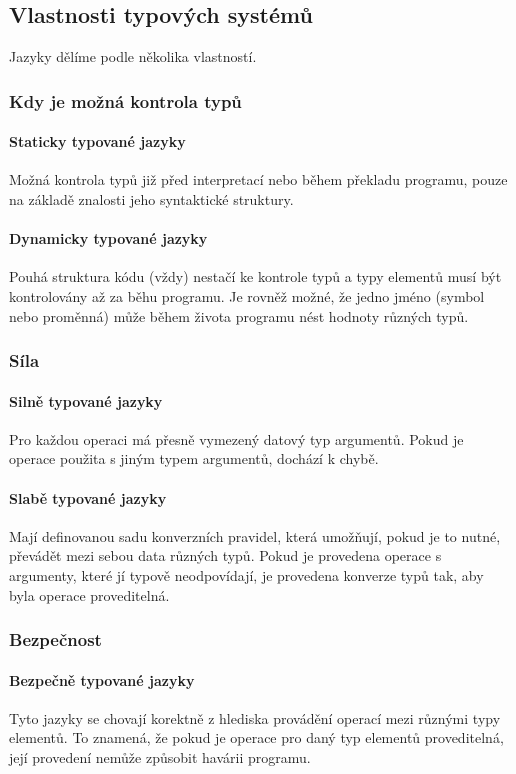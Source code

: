 \documentclass[10pt,a4paper]{article}
\begin{document}
  \subsection{Vlastnosti typových systémů}
    Jazyky dělíme podle několika vlastností.
    \subsubsection*{Kdy je možná kontrola typů}
      \paragraph{Staticky typované jazyky}
        Možná kontrola typů již před interpretací nebo během překladu programu, pouze na základě znalosti jeho syntaktické struktury.
      \paragraph{Dynamicky typované jazyky}
        Pouhá struktura kódu (vždy) nestačí ke kontrole typů a typy elementů musí být kontrolovány až za běhu programu. Je rovněž možné, že jedno jméno (symbol nebo proměnná) může během života programu nést hodnoty různých typů.
    \subsubsection*{Síla}
      \paragraph{Silně typované jazyky}
        Pro každou operaci má přesně vymezený datový typ argumentů. Pokud je operace použita s jiným typem argumentů, dochází k chybě.
      \paragraph{Slabě typované jazyky}
        Mají definovanou sadu konverzních pravidel, která umožňují, pokud je to nutné, převádět mezi sebou data různých typů. Pokud je provedena operace s argumenty, které jí typově neodpovídají, je provedena konverze typů tak, aby byla operace proveditelná.
    \subsubsection*{Bezpečnost}
      \paragraph{Bezpečně typované jazyky}
        Tyto jazyky se chovají korektně z hlediska provádění operací mezi různými typy elementů. To znamená, že pokud je operace pro daný typ elementů proveditelná, její provedení nemůže způsobit havárii programu.
\end{document}
